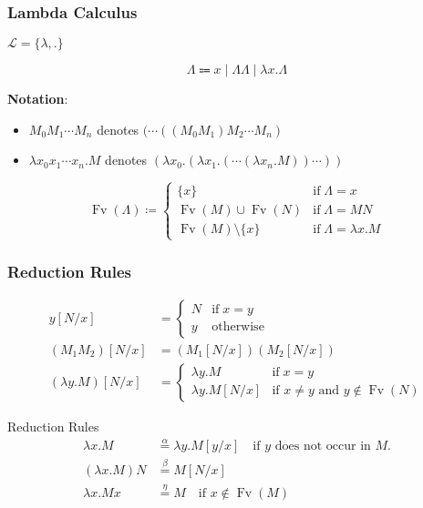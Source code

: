 \documentclass[UTF8,11pt,colorlinks,compress,openany]{beamer}%
\begin{document}
\begin{frame}\frametitle{Lambda Calculus}
	$\mathscr{L}=\{\lambda,.\}$
\setlength\abovedisplayskip{0pt}
\setlength\belowdisplayskip{0pt}
	\begin{definition}
		\[
		\Lambda\Coloneqq x\mid \Lambda\Lambda\mid \lambda x.\Lambda
		\]
	\end{definition}
	\textbf{Notation}:
	\begin{itemize}
		\item $M_0M_1\cdots M_n$ denotes $(\cdots((M_0M_1)M_2\cdots M_n)$
		\item $\lambda x_0x_1\cdots x_n.M$ denotes $(\lambda x_0.(\lambda x_1.(\cdots(\lambda x_n.M))\cdots))$
	\end{itemize}
\setlength\abovedisplayskip{0pt}
\setlength\belowdisplayskip{0pt}
	\begin{definition}
		\[
		\operatorname{Fv}(\Lambda)\coloneqq 
		\begin{cases}
		\{x\} &\text{if}\;\Lambda=x\\
		\operatorname{Fv}(M)\cup \operatorname{Fv}(N) &\text{if}\;\Lambda=MN\\
		\operatorname{Fv}(M)\setminus\{x\} &\text{if}\;\Lambda=\lambda x.M
		\end{cases}
		\]
	\end{definition}
\end{frame}

\begin{frame}\frametitle{Reduction Rules}
\setlength\abovedisplayskip{0pt}
\setlength\belowdisplayskip{0pt}
	\begin{definition}[Substitution]
		\begin{align*}
		y[N/x]&=
		\begin{cases}
		N &\text{if}\; x=y\\
		y &\text{otherwise}
		\end{cases}\\
		(M_1M_2)[N/x]&=\left(M_1[N/x]\right)\left(M_2[N/x]\right)\\
		(\lambda y.M)[N/x]&=
		\begin{cases}
		\lambda y.M &\text{if}\; x=y\\
		\lambda y.M[N/x] &\mbox{if $x\neq y$ and $y\notin \operatorname{Fv}(N)$}
		\end{cases}
		\end{align*}
	\end{definition}
\setlength\abovedisplayskip{0pt}
\setlength\belowdisplayskip{0pt}
	\begin{block}{Reduction Rules}
		\begin{align*}
		\lambda x.M&\stackrel{\alpha}{=}\lambda y.M[y/x] \quad\text{if $y$ does not occur in $M$.}\\
		(\lambda x.M)N&\stackrel{\beta}{=}M[N/x]\\
		\lambda x.Mx&\stackrel{\eta}{=}M \quad\text{if $x\notin \operatorname{Fv}(M)$}
		\end{align*}
	\end{block}
\end{frame}
\end{document}
